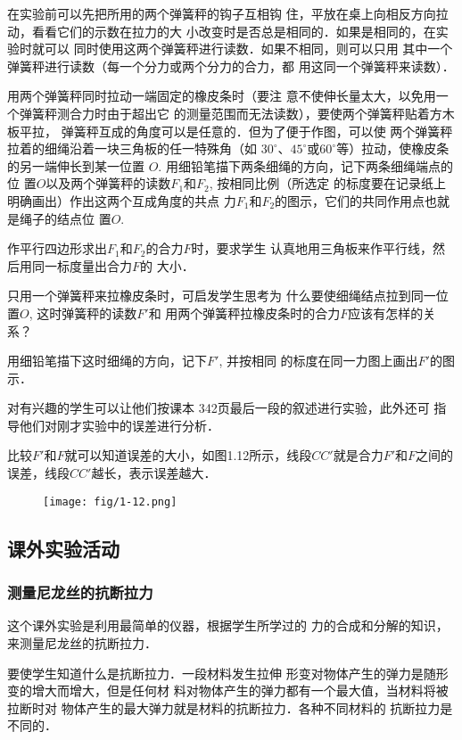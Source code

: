 在实验前可以先把所用的两个弹簧秤的钩子互相钩
住，平放在桌上向相反方向拉动，看看它们的示数在拉力的大
小改变时是否总是相同的．如果是相同的，在实验时就可以
同时使用这两个弹簧秤进行读数．如果不相同，则可以只用
其中一个弹簧秤进行读数（每一个分力或两个分力的合力，都
用这同一个弹簧秤来读数）．

用两个弹簧秤同时拉动一端固定的橡皮条时（要注
意不使伸长量太大，以免用一个弹簧秤测合力时由于超出它
的测量范围而无法读数），要使两个弹簧秤贴着方木板平拉，
弹簧秤互成的角度可以是任意的．但为了便于作图，可以使
两个弹簧秤拉着的细绳沿着一块三角板的任一特殊角（如
$30^{\circ}$、$45^{\circ}$或$60^{\circ}$等）拉动，使橡皮条的另一端伸长到某一位置
$O$. 用细铅笔描下两条细绳的方向，记下两条细绳端点的位
置$O$以及两个弹簧秤的读数$F_1$和$F_2$, 按相同比例（所选定
的标度要在记录纸上明确画出）作出这两个互成角度的共点
力$F_1$和$F_2$的图示，它们的共同作用点也就是绳子的结点位
置$O$.

作平行四边形求出$F_1$和$F_2$的合力$F$时，要求学生
认真地用三角板来作平行线，然后用同一标度量出合力$F$的
大小．

只用一个弹簧秤来拉橡皮条时，可启发学生思考为
什么要使细绳结点拉到同一位置$O$, 这时弹簧秤的读数$F'$和
用两个弹簧秤拉橡皮条时的合力$F$应该有怎样的关系？

用细铅笔描下这时细绳的方向，记下$F'$, 并按相同
的标度在同一力图上画出$F'$的图示．

对有兴趣的学生可以让他们按课本
342页最后一段的叙述进行实验，此外还可
指导他们对刚才实验中的误差进行分析．

比较$F'$和$F$就可以知道误差的大小，如图1.12所示，线段$CC'$就是合力$F'$和$F$之间的误差，线段$CC'$越长，表示误差越大．

\begin{figure}[htp]
    \centering
    \texttt{[image: fig/1-12.png]}
    \caption{}
\end{figure}

\subsection{课外实验活动}
\subsubsection{测量尼龙丝的抗断拉力}
这个课外实验是利用最简单的仪器，根据学生所学过的
力的合成和分解的知识，来测量尼龙丝的抗断拉力．

要使学生知道什么是抗断拉力．一段材料发生拉伸
形变对物体产生的弹力是随形变的增大而增大，但是任何材
料对物体产生的弹力都有一个最大值，当材料将被拉断时对
物体产生的最大弹力就是材料的抗断拉力．各种不同材料的
抗断拉力是不同的．

